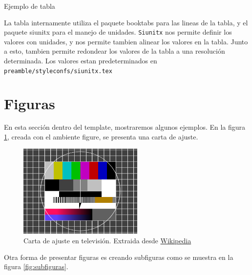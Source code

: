 \begin{table}
    \centering
    \caption{Ejemplo de tabla}
    \label{tab:ejemplo}
    
\end{table}

La tabla internamente utiliza el paquete booktabs para las lineas de la tabla, y el paquete siunitx para el manejo de unidades.
\texttt{Siunitx} nos permite definir los valores con unidades, y nos permite tambien alinear los valores en la tabla.
Junto a esto, tambien permite redondear los valores de la tabla a una resolución determinada. 
Los valores estan predeterminados en \texttt{preamble/styleconfs/siunitx.tex}


\section{Figuras}
En esta sección dentro del template, mostraremos algunos ejemplos. En la figura \ref{fig:ejemplo}, creada con el ambiente figure, se presenta una carta de ajuste.

\begin{figure}[htb]
    \centering
    \includegraphics[width=0.55\textwidth,keepaspectratio]{content/images/testimage.png}
    \caption{Carta de ajuste en televisión. Extraida desde \href{https://es.wikipedia.org/wiki/Carta_de_ajuste}{Wikipedia}}
    \label{fig:ejemplo}
\end{figure}


Otra forma de presentar figuras es creando subfiguras como se muestra en la figura \ref{fig:subfiguras}.

